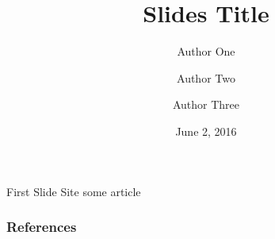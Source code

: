 \documentclass{beamer}
\begin{document}
\title{Slides Title}
\author{Author One \and Author Two \and Author Three}
\date{June 2, 2016}

\begin{frame}
\titlepage
\end{frame}


\begin{frame}{First Slide}
	Site some article~\cite{sutherland1968}
\end{frame}

\begin{frame}[allowframebreaks]
        \frametitle{References}
        
	
\end{frame}
\end{document}

